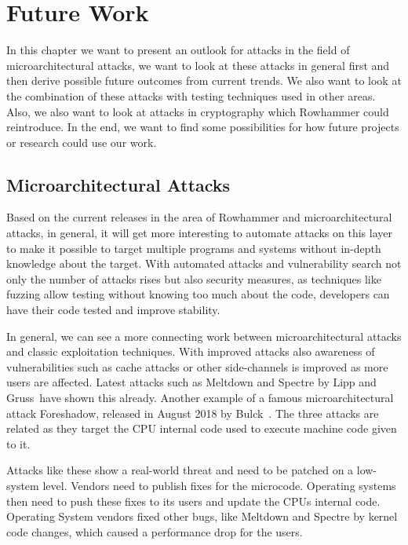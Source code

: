 \chapter{Future Work}\label{sec:futurework}

In this chapter we want to present an outlook for attacks in the field of
microarchitectural attacks, we want to look at these attacks in general first
and then derive possible future outcomes from current trends. We also want to
look at the combination of these attacks with testing techniques used in other
areas. Also, we also want to look at attacks in cryptography which Rowhammer
could reintroduce. In the end, we want to find some possibilities for how future
projects or research could use our work.

\section{Microarchitectural Attacks}

Based on the current releases in the area of Rowhammer and microarchitectural
attacks, in general, it will get more interesting to automate attacks on this
layer to make it possible to target multiple programs and systems without
in-depth knowledge about the target. With automated attacks and vulnerability
search not only the number of attacks rises but also security measures, as
techniques like fuzzing allow testing without knowing too much about the code,
developers can have their code tested and improve stability.

In general, we can see a more connecting work between microarchitectural attacks
and classic exploitation techniques. With improved attacks also awareness of
vulnerabilities such as cache attacks or other side-channels is improved as more
users are affected. Latest attacks such as Meltdown\cite{meltdown} and
Spectre\cite{spectre} by Lipp and Gruss~\etal have shown this already. Another
example of a famous microarchitectural attack Foreshadow\cite{foreshadow},
released in August 2018 by Bulck~\etal. The three attacks are related as they
target the CPU internal code used to execute machine code given to it.

Attacks like these show a real-world threat and need to be patched on a
low-system level. Vendors need to publish fixes for the microcode. Operating
systems then need to push these fixes to its users and update the
CPU\textquotesingle s internal code. Operating System vendors fixed other bugs,
like Meltdown and Spectre by kernel code changes, which caused a performance
drop for the users.

